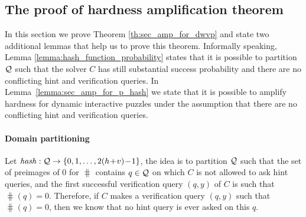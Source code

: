 %
\subsection{The proof of hardness amplification theorem}
\label{st:mainTheoremProof}
In this section we prove Theorem \ref{th:sec_amp_for_dwvp} and state two additional lemmas that help us to prove this theorem.
Informally speaking, Lemma \ref{lemma:hash_function_probability} states that it is possible to partition $\mathcal{Q}$ such that
the solver $C$ has still substantial success probability and there are no conflicting hint and verification queries.
In Lemma~\ref{lemma:sec_amp_for_p_hash} we state that it is possible to amplify hardness for dynamic interactive puzzles
under the assumption that there are no conflicting hint and verification queries.

\paragraph{Domain partitioning} Let $\operatorname{\mathit{hash}}:\mathcal{Q}\rightarrow\{0,1,\dots, 2(h\!+\!v)\!-\!1\}$, the idea is to partition $\mathcal{Q}$ such that the set of preimages
of $0$ for $\hash$ contains $q \in \mathcal{Q}$ on which $C$ is not allowed to ask hint queries,
and the first successful verification query $(q,y)$ of $C$ is such that $\hash(q) = 0$.
Therefore, if $C$ makes a verification query $(q,y)$ such that $\hash(q) = 0$, then we know that no hint query is ever asked on this $q$.

